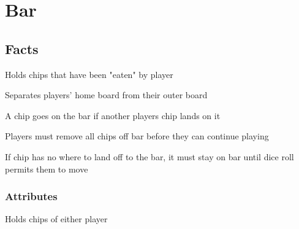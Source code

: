 \section{Bar}

\subsection{Facts}
\begin{dashed}
	\item Holds chips that have been "eaten" by player
	\item Separates players' home board from their outer board
	\item A chip goes on the bar if another players chip lands on it
	\item Players must remove all chips off bar before they can continue playing
	\item If chip has no where to land off to the bar, it must stay on bar until dice roll permits them to move
\end{dashed}

\subsubsection{Attributes}
\begin{dashed}
	\item Holds chips of either player
\end{dashed}

